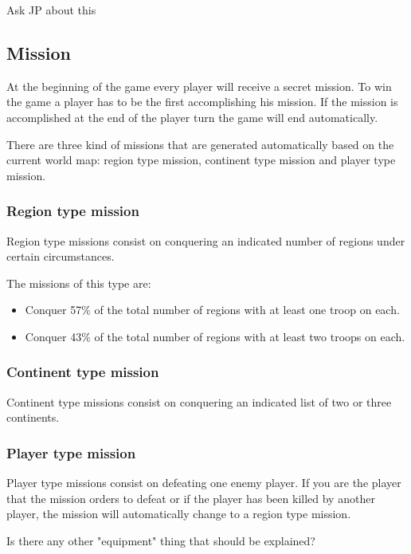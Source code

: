 \documentclass[12pt,a4paper]{article}
\begin{document}
\begin{todo}[Alberto]
  Ask JP about this
\end{todo}

\subsection{Mission}
At the beginning of the game every player will receive a secret mission. To win the game a player has to be the first accomplishing his mission. If the mission is accomplished at the end of the player turn the game will end automatically.

There are three kind of missions that are generated automatically based on the current world map: region type mission, continent type mission and player type mission.

\subsubsection{Region type mission}
Region type missions consist on conquering an indicated number of regions under certain circumstances.

The missions of this type are:

\begin{itemize}
\item Conquer 57\% of the total number of regions with at least one troop on each.
\item Conquer 43\% of the total number of regions with at least two troops on each.
\end{itemize}

\subsubsection{Continent type mission}
Continent type missions consist on conquering an indicated list of two or three continents.

\subsubsection{Player type mission}
Player type missions consist on defeating one enemy player. If you are the player that the mission orders to defeat or if the player has been killed by another player, the mission will automatically change to a region type mission.

\begin{todo}[Alberto]
  Is there any other "equipment" thing that should be explained?
\end{todo}
\end{document}

